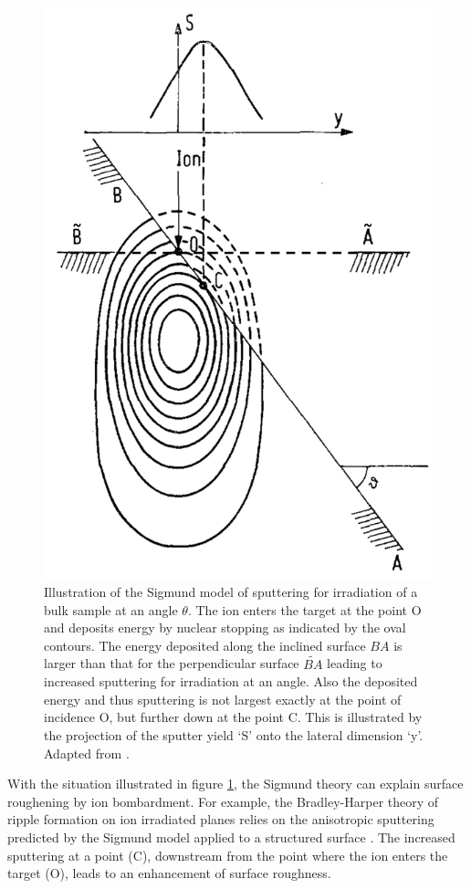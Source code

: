 \begin{figure}
	\centering
		\includegraphics[width=.45\textwidth]{images/anglesigmund.jpg}
	\caption{Illustration of the Sigmund model of sputtering for irradiation of a bulk sample at an angle $\theta$. The ion enters the target at the point O and deposits energy by nuclear stopping as indicated by the oval contours. The energy deposited along the inclined surface $BA$ is larger than that for the perpendicular surface $\widetilde{BA}$ leading to increased sputtering for irradiation at an angle. Also the deposited energy and thus sputtering is not largest exactly at the point of incidence O, but further down at the point C. This is illustrated by the projection of the sputter yield `S' onto the lateral dimension `y'. Adapted from \cite{sigmund_mechanism_1973}.}
	\label{anglesigmund}
\end{figure} 

With the situation illustrated in figure \ref{anglesigmund}, the Sigmund theory can explain surface roughening by ion bombardment. For example, the Bradley-Harper theory of ripple formation on ion irradiated planes relies on the anisotropic sputtering predicted by the Sigmund model applied to a structured surface \cite{sigmund_mechanism_1973,bradley_theory_1988}. The increased sputtering at a point (C), downstream from the point where the ion enters the target (O), leads to an enhancement of surface roughness.

